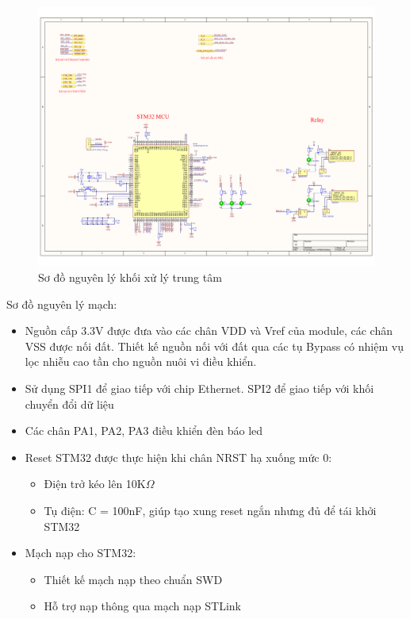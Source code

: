 \begin{figure}[!ht]
    \centering
    \includegraphics[width=1.0\linewidth]{Figures/Chap3_STM32-principle.pdf}
    \caption{Sơ đồ nguyên lý khối xử lý trung tâm}
    \label{fig:hinh3.5}
\end{figure}


Sơ đồ nguyên lý mạch:

\begin{itemize}
    \item Nguồn cấp 3.3V được đưa vào các chân VDD và Vref của module, các chân VSS được nối đất. Thiết kế nguồn nối với đất qua các tụ Bypass có nhiệm vụ lọc nhiễu cao tần cho nguồn nuôi vi điều khiển.
    \item Sử dụng SPI1 để giao tiếp với chip Ethernet. SPI2 để giao tiếp với khối chuyển đổi dữ liệu
    \item Các chân PA1, PA2, PA3 điều khiển đèn báo led 
    \item Reset STM32 được thực hiện khi chân NRST hạ xuống mức 0:
    \begin{itemize}
        \item Điện trở kéo lên 10K$\Omega$
        \item Tụ điện: C = 100nF, giúp tạo xung reset ngắn nhưng đủ để tái khởi STM32
    \end{itemize}
    \item Mạch nạp cho STM32:
    \begin{itemize}
        \item Thiết kế mạch nạp theo chuẩn SWD
        \item Hỗ trợ nạp thông qua mạch nạp STLink
    \end{itemize}

\end{itemize}

